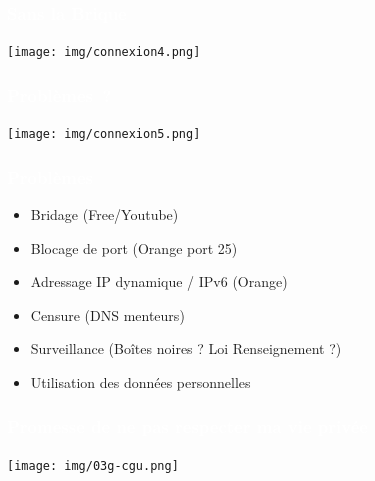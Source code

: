 \documentclass[notes=hide]{beamer}
\begin{document}
\begin{frame}[t]
\frametitle{\textcolor{white}{Sans la Brique}}
  \begin{center}
    \texttt{[image: img/connexion4.png]}
  \end{center}
\end{frame}

\begin{frame}[t]
\frametitle{\textcolor{white}{Problèmes~?}}
  \begin{center}
    \texttt{[image: img/connexion5.png]}
  \end{center}
\end{frame}

\begin{frame}
\frametitle{\textcolor{white}{Problèmes}}
  \begin{itemize}
    \item Bridage (Free/Youtube)
      \pause
    \item Blocage de port (Orange port 25)
      \pause
    \item Adressage IP dynamique / IPv6 (Orange)
      \pause
    \item Censure (DNS menteurs)
      \pause
    \item Surveillance (Boîtes noires ? Loi Renseignement ?)
      \pause
    \item Utilisation des données personnelles
  \end{itemize}
\end{frame}

\begin{frame}[t]
  \frametitle{\textcolor{white}{Promesse de ne pas respecter ma vie privée}}
\begin{center}
\vfill
\texttt{[image: img/03g-cgu.png]}
\vfill
\end{center}
\end{frame}
\end{document}
